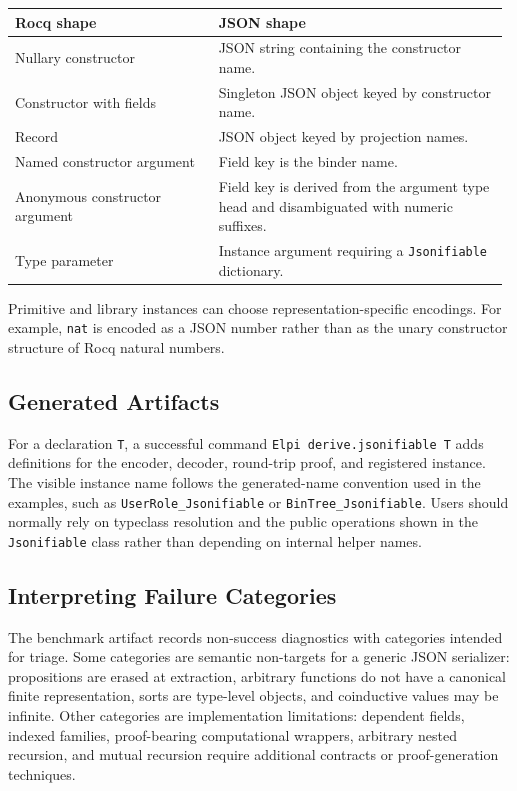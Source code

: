 \begin{center}
  \small
  \begin{tabular}{p{0.40\linewidth}p{0.58\linewidth}}
    \toprule
    Rocq shape                     & JSON shape                                                                                \\
    \midrule
    Nullary constructor            & JSON string containing the constructor name.                                              \\
    Constructor with fields        & Singleton JSON object keyed by constructor name.                                          \\
    Record                         & JSON object keyed by projection names.                                                    \\
    Named constructor argument     & Field key is the binder name.                                                             \\
    Anonymous constructor argument & Field key is derived from the argument type head and disambiguated with numeric suffixes. \\
    Type parameter                 & Instance argument requiring a \texttt{Jsonifiable} dictionary.                            \\
    \bottomrule
  \end{tabular}
\end{center}

Primitive and library instances can choose representation-specific encodings.
For example, \texttt{nat} is encoded as a JSON number rather than as the unary
constructor structure of Rocq natural numbers.

\subsection{Generated Artifacts}

For a declaration \texttt{T}, a successful command
\texttt{Elpi derive.jsonifiable T} adds definitions for the encoder, decoder,
round-trip proof, and registered instance.  The visible instance name follows
the generated-name convention used in the examples, such as
\texttt{UserRole\_Jsonifiable} or \texttt{BinTree\_Jsonifiable}.  Users should
normally rely on typeclass resolution and the public operations shown in the
\texttt{Jsonifiable} class rather than depending on internal helper names.

\subsection{Interpreting Failure Categories}

The benchmark artifact records non-success diagnostics with categories intended
for triage.  Some categories are semantic non-targets for a generic JSON
serializer: propositions are erased at extraction, arbitrary functions do not
have a canonical finite representation, sorts are type-level objects, and
coinductive values may be infinite.  Other categories are implementation
limitations: dependent fields, indexed families, proof-bearing computational
wrappers, arbitrary nested recursion, and mutual recursion require additional
contracts or proof-generation techniques.
